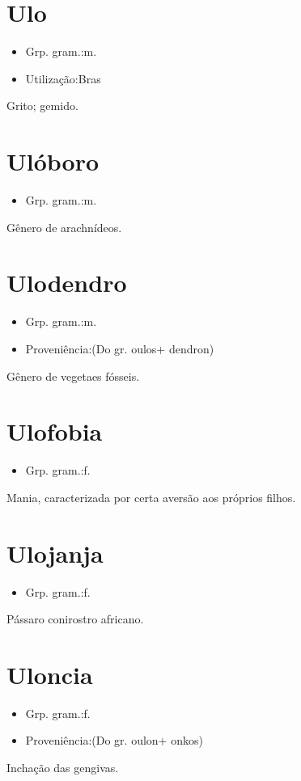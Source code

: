 \documentclass{article}
\begin{document}
\section{Ulo}
\begin{itemize}
\item {Grp. gram.:m.}
\end{itemize}
\begin{itemize}
\item {Utilização:Bras}
\end{itemize}
Grito; gemido.
\section{Ulóboro}
\begin{itemize}
\item {Grp. gram.:m.}
\end{itemize}
Gênero de arachnídeos.
\section{Ulodendro}
\begin{itemize}
\item {Grp. gram.:m.}
\end{itemize}
\begin{itemize}
\item {Proveniência:(Do gr. \textunderscore oulos\textunderscore  + \textunderscore dendron\textunderscore )}
\end{itemize}
Gênero de vegetaes fósseis.
\section{Ulofobia}
\begin{itemize}
\item {Grp. gram.:f.}
\end{itemize}
Mania, caracterizada por certa aversão aos próprios filhos.
\section{Ulojanja}
\begin{itemize}
\item {Grp. gram.:f.}
\end{itemize}
Pássaro conirostro africano.
\section{Uloncia}
\begin{itemize}
\item {Grp. gram.:f.}
\end{itemize}
\begin{itemize}
\item {Proveniência:(Do gr. \textunderscore oulon\textunderscore  + \textunderscore onkos\textunderscore )}
\end{itemize}
Inchação das gengivas.
\end{document}
